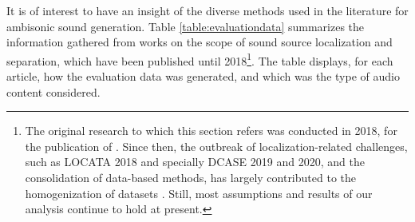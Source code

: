
It is of interest to have an insight of the diverse methods used in the literature for ambisonic sound generation. Table \ref{table:evaluationdata} summarizes the information gathered from works on the scope of sound source localization and separation, which have been published until 
2018\footnote{The original research to which this section refers was conducted in 2018, for the publication of \cite{perez2018ambiscaper}. Since then, the outbreak of localization-related challenges, such as LOCATA 2018 and specially DCASE 2019 and 2020, and the consolidation of data-based methods, has largely contributed to the homogenization of datasets \cite{evers2020locata, adavanne2019multi, politis2020dataset}. Still, most assumptions and results of our analysis continue to hold at present.}.
 The table displays, for each article, how the evaluation data was generated, and which was the type of audio content considered.
 

